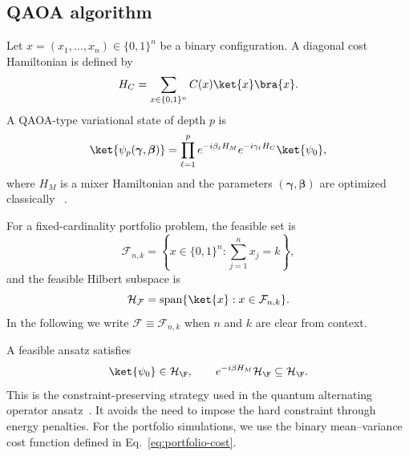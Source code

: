 \subsection{QAOA algorithm}

Let $x=(x_1,\ldots,x_n)\in\{0,1\}^n$ be a binary configuration. A diagonal
cost Hamiltonian is defined by
\begin{equation}
    H_C =
    \sum_{x\in\{0,1\}^n} C(x)\ket{x}\bra{x}.
    \label{eq:cost-hamiltonian}
\end{equation}
A QAOA-type variational state of depth $p$ is
\begin{equation}
    \ket{\psi_p(\boldsymbol{\gamma},\boldsymbol{\beta})}
    =
    \prod_{\ell=1}^{p}
    e^{-i\beta_\ell H_M}
    e^{-i\gamma_\ell H_C}
    \ket{\psi_0},
    \label{eq:qaoa-type-state}
\end{equation}
where $H_M$ is a mixer Hamiltonian and the parameters
$(\boldsymbol{\gamma},\boldsymbol{\beta})$ are optimized classically
~\cite{Farhi2014,Cerezo2021,Blekos2024}.

For a fixed-cardinality portfolio problem, the feasible set is
\begin{equation}
    \mathcal{F}_{n,k}
    =
    \left\{
    x\in\{0,1\}^{n}:
    \sum_{j=1}^{n}x_j=k
    \right\},
    \label{eq:feasible-set}
\end{equation}
and the feasible Hilbert subspace is
\begin{equation}
    \mathcal{H}_{\mathcal{F}}
    =
    \operatorname{span}\{\ket{x}:x\in\mathcal{F}_{n,k}\}.
\end{equation}
    In the following we write \(\mathcal{F}\equiv\mathcal{F}_{n,k}\) when \(n\) and
\(k\) are clear from context. 
\par A feasible ansatz satisfies
\begin{equation}
    \ket{\psi_0}\in\mathcal{H}_{\F},
    \qquad
    e^{-i\beta H_M}\mathcal{H}_{\F}
    \subseteq
    \mathcal{H}_{\F}.
    \label{eq:feasible-condition}
\end{equation}
This is the constraint-preserving strategy used in the quantum alternating
operator ansatz~\cite{Hadfield2019}. It avoids the need to impose the hard
constraint through energy penalties.
For the portfolio simulations, we use the binary mean--variance cost function
defined in Eq.~\eqref{eq:portfolio-cost}.
